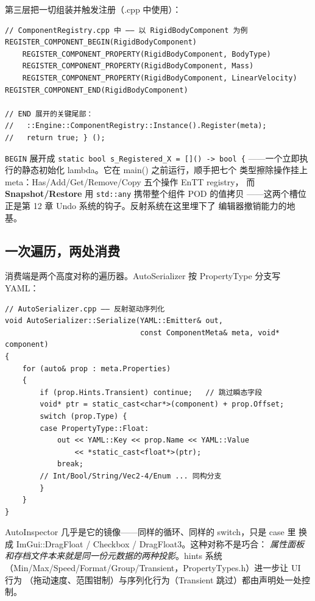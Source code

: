 第三层把一切组装并触发注册（.cpp 中使用）：

\begin{lstlisting}
// ComponentRegistry.cpp 中 —— 以 RigidBodyComponent 为例
REGISTER_COMPONENT_BEGIN(RigidBodyComponent)
    REGISTER_COMPONENT_PROPERTY(RigidBodyComponent, BodyType)
    REGISTER_COMPONENT_PROPERTY(RigidBodyComponent, Mass)
    REGISTER_COMPONENT_PROPERTY(RigidBodyComponent, LinearVelocity)
REGISTER_COMPONENT_END(RigidBodyComponent)

// END 展开的关键尾部：
//   ::Engine::ComponentRegistry::Instance().Register(meta);
//   return true; } ();
\end{lstlisting}

\texttt{BEGIN} 展开成 \texttt{static bool s\_Registered\_X = []() -> bool \{}
——一个立即执行的静态初始化 lambda。它在 main() 之前运行，顺手把七个
类型擦除操作挂上 meta：Has/Add/Get/Remove/Copy 五个操作 EnTT registry，
而 \textbf{Snapshot/Restore} 用 \texttt{std::any} 携带整个组件 POD 的值拷贝
——这两个槽位正是第 12 章 Undo 系统的钩子。反射系统在这里埋下了
编辑器撤销能力的地基。

\subsection{一次遍历，两处消费}

消费端是两个高度对称的遍历器。AutoSerializer 按 PropertyType 分支写 YAML：

\begin{lstlisting}
// AutoSerializer.cpp —— 反射驱动序列化
void AutoSerializer::Serialize(YAML::Emitter& out,
                               const ComponentMeta& meta, void* component)
{
    for (auto& prop : meta.Properties)
    {
        if (prop.Hints.Transient) continue;   // 跳过瞬态字段
        void* ptr = static_cast<char*>(component) + prop.Offset;
        switch (prop.Type) {
        case PropertyType::Float:
            out << YAML::Key << prop.Name << YAML::Value
                << *static_cast<float*>(ptr);
            break;
        // Int/Bool/String/Vec2-4/Enum ... 同构分支
        }
    }
}
\end{lstlisting}

AutoInspector 几乎是它的镜像——同样的循环、同样的 switch，只是 case 里
换成 ImGui::DragFloat / Checkbox / DragFloat3。这种对称不是巧合：
\emph{属性面板和存档文件本来就是同一份元数据的两种投影}。hints 系统
（Min/Max/Speed/Format/Group/Transient，PropertyTypes.h）进一步让 UI 行为
（拖动速度、范围钳制）与序列化行为（Transient 跳过）都由声明处一处控制。

